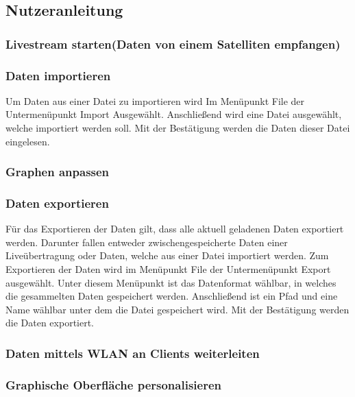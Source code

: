 \subsection{Nutzeranleitung}
\subsubsection{Livestream starten(Daten von einem Satelliten empfangen)}
\subsubsection{Daten importieren}
Um Daten aus einer Datei zu importieren wird Im Menüpunkt File der Untermenüpunkt Import Ausgewählt. Anschließend wird eine Datei ausgewählt, welche importiert werden soll. Mit der Bestätigung werden die Daten dieser Datei eingelesen.
\subsubsection{Graphen anpassen}
\subsubsection{Daten exportieren}
Für das Exportieren der Daten gilt, dass alle aktuell geladenen Daten exportiert werden. Darunter fallen entweder zwischengespeicherte Daten einer Liveübertragung oder Daten, welche aus einer Datei importiert werden.
Zum Exportieren der Daten wird im Menüpunkt File der Untermenüpunkt Export ausgewählt. Unter diesem Menüpunkt ist das Datenformat wählbar, in welches die gesammelten Daten gespeichert werden. Anschließend ist ein Pfad und eine Name wählbar unter dem die Datei gespeichert wird. Mit der Bestätigung werden die Daten exportiert.
\subsubsection{Daten mittels WLAN an Clients weiterleiten}
\subsubsection{Graphische Oberfläche personalisieren}